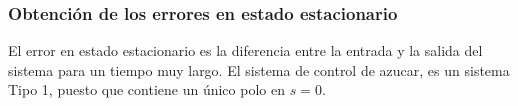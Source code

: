 \documentclass[journal]{IEEEtran}
\begin{document}
\subsubsection*{Obtenci\'on de los errores en estado 
estacionario}
El error en estado estacionario es la diferencia entre la 
entrada y la salida del sistema para un tiempo muy largo. 
El sistema de control de azucar, es un sistema Tipo 1,
puesto que contiene un \'unico polo en $s = 0$. \\
%

\end{document}
